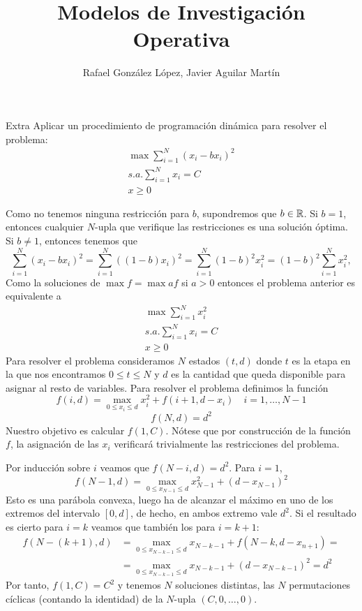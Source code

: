 \documentclass[twoside]{article}
\begin{document}
\title{Modelos de Investigación Operativa}
\author{Rafael González López, Javier Aguilar Martín}
\maketitle

\begin{ejercicio}{Extra}
Aplicar un procedimiento de programación dinámica para resolver el problema:
\begin{align*}
\max \sum_{i=1}^N (x_i-bx_i)^2\\
s.a. \sum_{i=1}^N x_i=C\\
x\geq 0
\end{align*}
\end{ejercicio}
\begin{solucion}
Como no tenemos ninguna restricción para $b$, supondremos que $b\in\mathbb{R}$. Si $b=1$, entonces cualquier $N$-upla que verifique las restricciones es una solución óptima. Si $b\neq 1$, entonces tenemos que
$$\sum_{i=1}^N (x_i-bx_i)^2=\sum_{i=1}^N \left((1-b)x_i\right)^2=\sum_{i=1}^N(1-b)^2x_i^2=(1-b)^2\sum_{i=1}^N x_i^2,$$ 
Como la soluciones de $\max f = \max a f$ si $a>0$ entonces el problema anterior es equivalente a
\begin{align*}
\max \sum_{i=1}^N x_i^2\\
s.a. \sum_{i=1}^N x_i=C\\
x\geq 0
\end{align*}
Para resolver el problema consideramos $N$ estados $(t,d)$ donde $t$ es la etapa en la que nos encontramos $0\leq t\leq N$ y $d$ es la cantidad que queda disponible para asignar al resto de variables.  Para resolver el problema definimos la función
$$f(i,d) = \max_{0\leq x_i \leq d}x_i^2+f(i+1,d-x_i) \quad i=1,\dotsc,N-1$$
$$f(N,d)=d^2
$$
Nuestro objetivo es calcular $f(1,C)$. Nótese que por construcción de la función $f$, la asignación de las $x_i$ verificará trivialmente las restricciones del problema.

Por inducción sobre $i$ veamos que $f(N-i,d) = d^2$. Para $i=1$, $$f(N-1,d)= \max_{0\leq x_{N-1} \leq d} x_{N-1}^2 + (d-x_{N-1})^2$$ Esto es una parábola convexa, luego ha de alcanzar el máximo en uno de los extremos del intervalo $[0,d]$, de hecho, en ambos extremo vale $d^2$. Si el resultado es cierto para $i=k$ veamos que también los para $i=k+1$:
\begin{align*}
f(N-(k+1),d) &= \max_{0\leq x_{N-k-1} \leq d} x_{N-k-1} + f(N-k,d-x_{n+1}) = \\
&=\max_{0\leq x_{N-k-1}\leq d} x_{N-k-1}+(d-x_{N-k-1})^2 = d^2
\end{align*}
Por tanto, $f(1,C)=C^2$ y tenemos $N$ soluciones distintas, las $N$ permutaciones cíclicas (contando la identidad) de la $N$-upla $(C,0,\dotsc,0)$.
\end{solucion}
\end{document}
